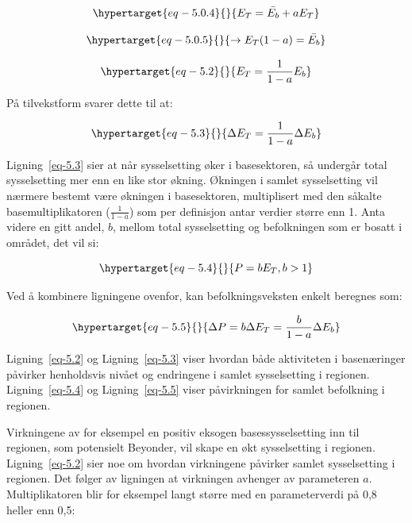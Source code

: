 \documentclass[
]{article}
\begin{document}
\begin{equation}\protect\hypertarget{eq-5.0.4}{}{
E_T = \bar{E_b} + aE_T
}\label{eq-5.0.4}\end{equation}

\begin{equation}\protect\hypertarget{eq-5.0.5}{}{
\rightarrow E_T (1-a) = \bar{E_b}
}\label{eq-5.0.5}\end{equation}

\begin{equation}\protect\hypertarget{eq-5.2}{}{
E_T = \frac{1}{1-a}E_b
}\label{eq-5.2}\end{equation}

På tilvekstform svarer dette til at:

\begin{equation}\protect\hypertarget{eq-5.3}{}{
\Delta E_T = \frac{1}{1-a} \Delta E_b
}\label{eq-5.3}\end{equation}

Ligning~\ref{eq-5.3} sier at når sysselsetting øker i basesektoren, så
undergår total sysselsetting mer enn en like stor økning. Økningen i
samlet sysselsetting vil nærmere bestemt være økningen i basesektoren,
multiplisert med den såkalte basemultiplikatoren (\(\frac{1}{1-a}\)) som
per definisjon antar verdier større enn 1. Anta videre en gitt andel,
\(b\), mellom total sysselsetting og befolkningen som er bosatt i
området, det vil si:

\begin{equation}\protect\hypertarget{eq-5.4}{}{
P = bE_T, b >1
}\label{eq-5.4}\end{equation}

Ved å kombinere ligningene ovenfor, kan befolkningsveksten enkelt
beregnes som:

\begin{equation}\protect\hypertarget{eq-5.5}{}{
\Delta P = b \Delta E_T = \frac{b}{1-a} \Delta E_b
}\label{eq-5.5}\end{equation}

Ligning~\ref{eq-5.2} og Ligning~\ref{eq-5.3} viser hvordan både
aktiviteten i basenæringer påvirker henholdsvis nivået og endringene i
samlet sysselsetting i regionen. Ligning~\ref{eq-5.4} og
Ligning~\ref{eq-5.5} viser påvirkningen for samlet befolkning i
regionen.

Virkningene av for eksempel en positiv eksogen basessysselsetting inn
til regionen, som potensielt Beyonder, vil skape en økt sysselsetting i
regionen. Ligning~\ref{eq-5.2} sier noe om hvordan virkningene påvirker
samlet sysselsetting i regionen. Det følger av ligningen at virkningen
avhenger av parameteren \(a\). Multiplikatoren blir for eksempel langt
større med en parameterverdi på 0,8 heller enn 0,5:
\end{document}
